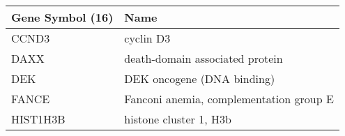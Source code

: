 \begin{tabular}{ll}
\toprule
Gene Symbol (16) &                                    Name \\
\midrule
           CCND3 &                               cyclin D3 \\
            DAXX &         death-domain associated protein \\
             DEK &              DEK oncogene (DNA binding) \\
           FANCE & Fanconi anemia, complementation group E \\
        HIST1H3B &                  histone cluster 1, H3b \\
\bottomrule
\end{tabular}
